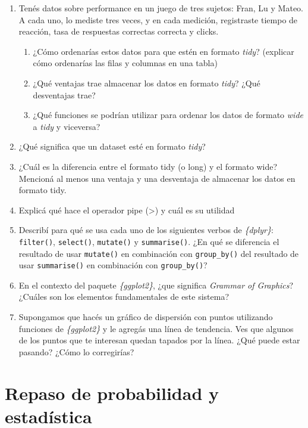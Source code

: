 \documentclass[
  letterpaper,
  DIV=11,
  numbers=noendperiod,
  oneside]{scrreprt}
\begin{document}
\begin{enumerate}
\def\labelenumi{\arabic{enumi}.}
\item
  Tenés datos sobre performance en un juego de tres sujetos: Fran, Lu y
  Mateo. A cada uno, lo mediste tres veces, y en cada medición,
  registraste tiempo de reacción, tasa de respuestas correctas correcta
  y clicks.

  \begin{enumerate}
  \def\labelenumii{\alph{enumii})}
  \item
    ¿Cómo ordenarías estos datos para que estén en formato \emph{tidy}?
    (explicar cómo ordenarías las filas y columnas en una tabla)
  \item
    ¿Qué ventajas trae almacenar los datos en formato \emph{tidy}? ¿Qué
    desventajas trae?
  \item
    ¿Qué funciones se podrían utilizar para ordenar los datos de formato
    \emph{wide} a \emph{tidy} y viceversa?
  \end{enumerate}
\item
  ¿Qué significa que un dataset esté en formato \emph{tidy}?
\item
  ¿Cuál es la diferencia entre el formato tidy (o long) y el formato
  wide? Mencioná al menos una ventaja y una desventaja de almacenar los
  datos en formato tidy.
\item
  Explicá qué hace el operador pipe (\textbar\textgreater) y cuál es su
  utilidad
\item
  Describí para qué se usa cada uno de los siguientes verbos de
  \emph{\{dplyr\}}: \texttt{filter()}, \texttt{select()},
  \texttt{mutate()} y \texttt{summarise()}. ¿En qué se diferencia el
  resultado de usar \texttt{mutate()} en combinación con
  \texttt{group\_by()} del resultado de usar \texttt{summarise()} en
  combinación con \texttt{group\_by()}?
\item
  En el contexto del paquete \emph{\{ggplot2\}}, ¿que significa
  \emph{Grammar of Graphics}? ¿Cuáles son los elementos fundamentales de
  este sistema?
\item
  Supongamos que hacés un gráfico de dispersión con puntos utilizando
  funciones de \emph{\{ggplot2\}} y le agregás una línea de tendencia.
  Ves que algunos de los puntos que te interesan quedan tapados por la
  línea. ¿Qué puede estar pasando? ¿Cómo lo corregirías?
\end{enumerate}


\hypertarget{sec-intro_stat}{%
\chapter{Repaso de probabilidad y estadística}\label{sec-intro_stat}}
\end{document}
